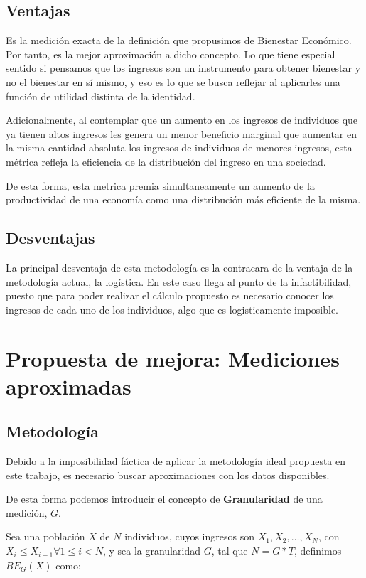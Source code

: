 \subsection{Ventajas}

Es la medición exacta de la definición que propusimos de Bienestar Económico. Por tanto, es la mejor aproximación a dicho concepto. Lo que tiene especial sentido si pensamos que los ingresos son un instrumento para obtener bienestar y no el bienestar en sí mismo, y eso es lo que se busca reflejar al aplicarles una función de utilidad distinta de la identidad.


Adicionalmente, al contemplar que un aumento en los ingresos de individuos que ya tienen altos ingresos les genera un menor beneficio marginal que aumentar en la misma cantidad absoluta los ingresos de individuos de menores ingresos, esta métrica refleja la eficiencia de la distribución del ingreso en una sociedad.

De esta forma, esta metrica premia simultaneamente un aumento de la productividad de una economía como una distribución más eficiente de la misma.

\subsection{Desventajas}

La principal desventaja de esta metodología es la contracara de la ventaja de la metodología actual, la logística. En este caso llega al punto de la infactibilidad, puesto que para poder realizar el cálculo propuesto es necesario conocer los ingresos de cada uno de los individuos, algo que es logisticamente imposible.

\section{Propuesta de mejora: Mediciones aproximadas}

\subsection{Metodología}

Debido a la imposibilidad fáctica de aplicar la metodología ideal propuesta en este trabajo, es necesario buscar aproximaciones con los datos disponibles.

De esta forma podemos introducir el concepto de \textbf{Granularidad} de una medición, $G$.

Sea una población $X$ de $N$ individuos, cuyos ingresos son $X_1, X_2, \dots, X_N $, con $X_i \leq X_{i+1} \forall 1 \leq i < N$, y sea la granularidad $G$, tal que $N = G * T$, definimos $BE_G(X)$ como:

